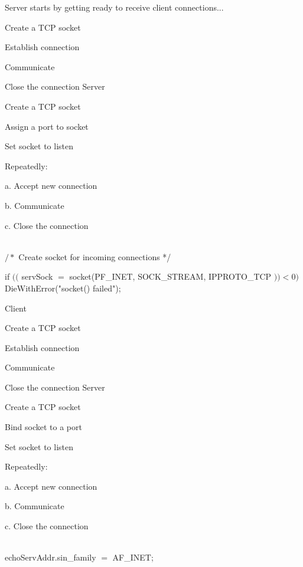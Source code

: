 \begin{description}
Server starts by getting ready to receive client connections...



\begin{enumerate}
  \ite Create a TCP socket

  \ite Establish connection

  \ite Communicate

  \ite Close the connection Server

\end{enumerate}

Create a TCP socket

Assign a port to socket

Set socket to listen

Repeatedly:

a. Accept new connection

b. Communicate

c. Close the connection


\os{\newpage}\item[{\rot\bf  TCP Client/Server Interaction }]~\\[-3ex]

$/ *$ Create socket for incoming connections */

if $(($ servSock $=$ socket(PF\_INET, SOCK\_STREAM, IPPROTO\_TCP $))<0)$ DieWithError("socket() failed");

Client

\begin{enumerate}
  \ite Create a TCP socket

  \ite Establish connection

  \ite Communicate

  \ite Close the connection Server

\end{enumerate}

Create a TCP socket

Bind socket to a port

Set socket to listen

Repeatedly:

a. Accept new connection

b. Communicate

c. Close the connection


\os{\newpage}\item[{\rot\bf  TCP Client/Server Interaction }]~\\[-3ex]

echoServAddr.sin\_family $=$ AF\_INET;


\end{description}
